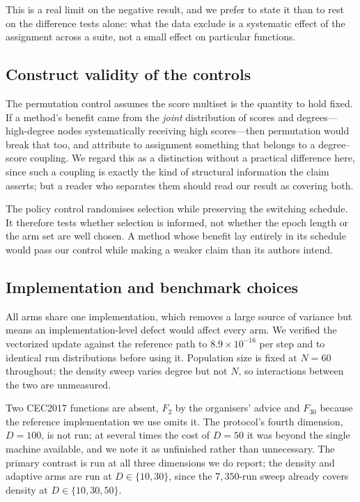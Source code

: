 This is a real limit on the negative result, and we prefer to state it than to
rest on the difference tests alone: what the data exclude is a systematic
effect of the assignment across a suite, not a small effect on particular
functions.

\subsection{Construct validity of the controls}

The permutation control assumes the score multiset is the quantity to hold
fixed. If a method's benefit came from the \emph{joint} distribution of scores
and degrees---high-degree nodes systematically receiving high scores---then
permutation would break that too, and attribute to assignment something that
belongs to a degree--score coupling. We regard this as a distinction without a
practical difference here, since such a coupling is exactly the kind of
structural information the claim asserts; but a reader who separates them
should read our result as covering both.

The policy control randomises selection while preserving the switching
schedule. It therefore tests whether selection is informed, not whether the
epoch length or the arm set are well chosen. A method whose benefit lay
entirely in its schedule would pass our control while making a weaker claim
than its authors intend.

\subsection{Implementation and benchmark choices}

All arms share one implementation, which removes a large source of variance but
means an implementation-level defect would affect every arm. We verified the
vectorized update against the reference path to $8.9\times10^{-16}$ per step
and to identical run distributions before using it. Population size is fixed at
$N=60$ throughout; the density sweep varies degree but not $N$, so interactions
between the two are unmeasured.

Two CEC2017 functions are absent, $F_{2}$ by the organisers' advice and
$F_{30}$ because the reference implementation we use omits it. The protocol's
fourth dimension, $D=100$, is not run; at several times the cost of $D=50$ it
was beyond the single machine available, and we note it as unfinished rather
than unnecessary. The primary contrast is run at all three dimensions we do
report; the density and adaptive arms are run at $D\in\{10,30\}$, since the
$7{,}350$-run sweep already covers density at $D\in\{10,30,50\}$.


